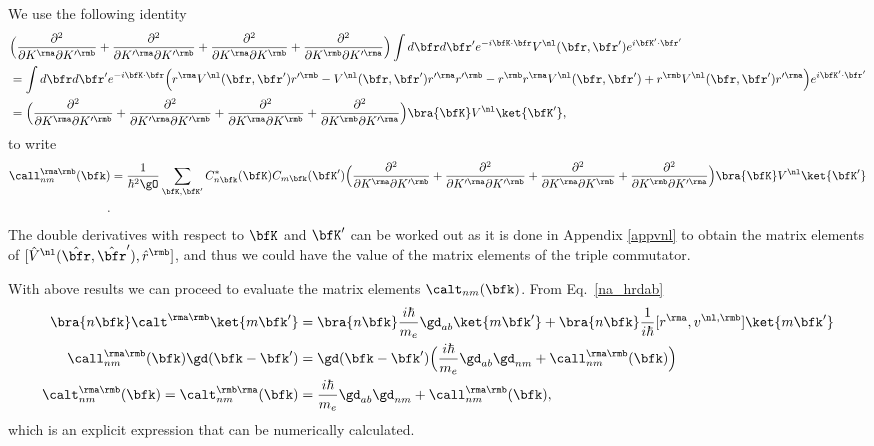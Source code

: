 We use the following identity
\begin{align}\label{3.4}
&
\Big(
\frac{\partial^2}{\partial K^\rma\partial K'^\rmb}
+
\frac{\partial^2}{\partial K'^\rma\partial K'^\rmb}
+
\frac{\partial^2}{\partial K^\rma\partial K^\rmb}
+
\frac{\partial^2}{\partial K^\rmb\partial K'^\rma}
\Big)
\int
d\bfr d\bfr'
 e^{-i\bfK\cdot\bfr}
V^\nl(\bfr,\bfr')
e^{i\bfK'\cdot\bfr'}
\nonumber\\
&=
\int d\bfr d\bfr'
 e^{-i\bfK\cdot\bfr}
\Big( 
r^{\rma} 
V^\nl(\bfr,\bfr') 
r'^\rmb
- 
V^\nl(\bfr,\bfr') 
r'^\rma 
r'^{\rmb}
- 
r^\rmb 
r^{\rma} 
V^\nl(\bfr,\bfr')
+
 r^\rmb 
V^\nl(\bfr,\bfr') 
r'^{\rma}
\Big)  
e^{i\bfK'\cdot\bfr'}
\nonumber\\
&=
\Big(
\frac{\partial^2}{\partial K^\rma\partial K'^\rmb}
+
\frac{\partial^2}{\partial K'^\rma\partial K'^\rmb}
+
\frac{\partial^2}{\partial K^\rma\partial K^\rmb}
+
\frac{\partial^2}{\partial K^\rmb\partial K'^\rma}
\Big)
\bra{\bfK} 
V^\nl
\ket{\bfK'} 
,
\end{align}
to write
\begin{align}\label{3.7}
\call^{\rma\rmb}_{nm}(\bfk)
&=
\frac{1}{\hbar^2\gO}
\sum_{\bfK,\bfK'} 
C^*_{n\bfk}(\bfK) 
C_{m\bfk}(\bfK')
\Big(
\frac{\partial^2}{\partial K^\rma\partial K'^\rmb}
+
\frac{\partial^2}{\partial K'^\rma\partial K'^\rmb}
+
\frac{\partial^2}{\partial K^\rma\partial K^\rmb}
+
\frac{\partial^2}{\partial K^\rmb\partial K'^\rma}
\Big)
\bra{\bfK} 
V^\nl
\ket{\bfK'} 
\nonumber\\
.
\end{align} 
The double derivatives with respect to $\bfK$ and $\bfK'$ can be worked out as
it is done in Appendix \ref{appvnl}  
to obtain the matrix elements of
$[\hat V^\nl(\hat\bfr,\hat\bfr'),\hat r^\rmb]$,\cite{olevano} 
and thus we
could have the value of the matrix elements of the triple commutator.\cite{valerie}

With above results we can proceed to evaluate the matrix elements  $\calt_{nm}(\bfk)$.
From Eq.~\eqref{na_hrdab}
\begin{align}\label{na_hrdabn}
\bra{n\bfk}
\calt^{\rma\rmb}
\ket{m\bfk'}
&=
\bra{n\bfk}
\frac{i\hbar}{m_e}\gd_{ab}
\ket{m\bfk'}
+
\bra{n\bfk}
\frac{1}{i\hbar}[r^{\rma},v^{\nl,\rmb}]
\ket{m\bfk'}
\nonumber\\
\call^{\rma\rmb}_{nm}(\bfk)
\gd(\bfk-\bfk')
&=
\gd(\bfk-\bfk')
\Big(
\frac{i\hbar}{m_e}\gd_{ab}\gd_{nm}
+
\call_{nm}^{\rma\rmb}(\bfk)\Big)
\nonumber\\
\calt^{\rma\rmb}_{nm}(\bfk)
=\calt^{\rmb\rma}_{nm}(\bfk)
&=
\frac{i\hbar}{m_e}\gd_{ab}\gd_{nm}
+
\call_{nm}^{\rma\rmb}(\bfk)
,
\end{align}
which is an explicit expression that can be numerically calculated.
